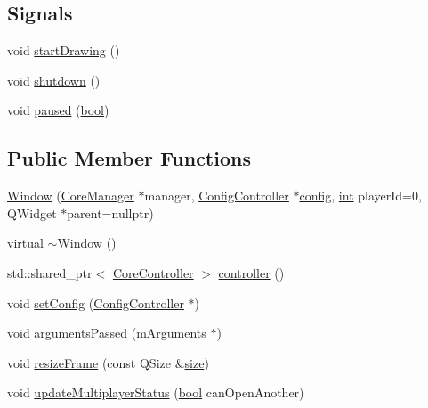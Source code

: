 \subsection*{Signals}
\begin{DoxyCompactItemize}
\item 
void \mbox{\hyperlink{class_q_g_b_a_1_1_window_a14f748045877e64df2193fede906a951}{start\+Drawing}} ()
\item 
void \mbox{\hyperlink{class_q_g_b_a_1_1_window_a76ef9d12e6314062232114b5c1f0fa82}{shutdown}} ()
\item 
void \mbox{\hyperlink{class_q_g_b_a_1_1_window_a8fb7379452f61684d4554b4b2d7911b8}{paused}} (\mbox{\hyperlink{libretro_8h_a4a26dcae73fb7e1528214a068aca317e}{bool}})
\end{DoxyCompactItemize}
\subsection*{Public Member Functions}
\begin{DoxyCompactItemize}
\item 
\mbox{\hyperlink{class_q_g_b_a_1_1_window_ad0f32ffced44b9d2f3121927a7d7634d}{Window}} (\mbox{\hyperlink{class_q_g_b_a_1_1_core_manager}{Core\+Manager}} $\ast$manager, \mbox{\hyperlink{class_q_g_b_a_1_1_config_controller}{Config\+Controller}} $\ast$\mbox{\hyperlink{deflate_8c_a4473b5227787415097004fd39f55185e}{config}}, \mbox{\hyperlink{ioapi_8h_a787fa3cf048117ba7123753c1e74fcd6}{int}} player\+Id=0, Q\+Widget $\ast$parent=nullptr)
\item 
virtual \mbox{\hyperlink{class_q_g_b_a_1_1_window_a245d821e6016fa1f6970ccbbedd635f6}{$\sim$\+Window}} ()
\item 
std\+::shared\+\_\+ptr$<$ \mbox{\hyperlink{class_q_g_b_a_1_1_core_controller}{Core\+Controller}} $>$ \mbox{\hyperlink{class_q_g_b_a_1_1_window_a708613d047d676e79ce9b0dbed95a891}{controller}} ()
\item 
void \mbox{\hyperlink{class_q_g_b_a_1_1_window_ae4f2cabe0032595068a69b724ecc13c5}{set\+Config}} (\mbox{\hyperlink{class_q_g_b_a_1_1_config_controller}{Config\+Controller}} $\ast$)
\item 
void \mbox{\hyperlink{class_q_g_b_a_1_1_window_a5015ae1d839b7d793a547c292df687b3}{arguments\+Passed}} (m\+Arguments $\ast$)
\item 
void \mbox{\hyperlink{class_q_g_b_a_1_1_window_a6486c6d4704a8b38ee542611f1ca97fc}{resize\+Frame}} (const Q\+Size \&\mbox{\hyperlink{ioapi_8h_a014d89bd76f74ef3a29c8f04b473eb76}{size}})
\item 
void \mbox{\hyperlink{class_q_g_b_a_1_1_window_acf3ddbe0a01cf461d4262e5504c70e87}{update\+Multiplayer\+Status}} (\mbox{\hyperlink{libretro_8h_a4a26dcae73fb7e1528214a068aca317e}{bool}} can\+Open\+Another)
\end{DoxyCompactItemize}

